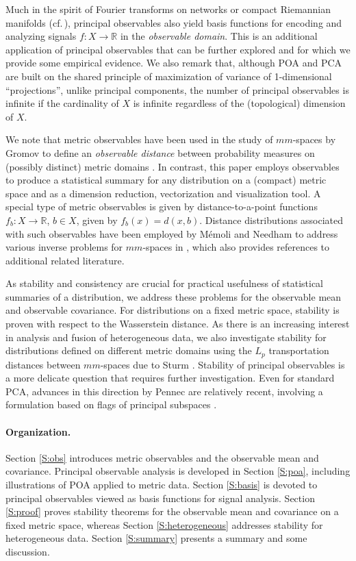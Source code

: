 \documentclass[11pt]{article}
\theoremstyle{definition}
\newcommand{\real}{\ensuremath{\mathbb{R}}}
\begin{document}
Much in the spirit of Fourier transforms on networks or compact Riemannian manifolds (cf.\,\cite{rosenberg_1997,hammond2009}), principal observables also yield basis functions for encoding and analyzing signals $f \colon X \to \real$ in the {\em observable domain}. This is an additional application of principal observables that can be further explored and for which we provide some empirical evidence. We also remark that, although POA and PCA are built on the shared principle of maximization of variance of 1-dimensional ``projections'', unlike principal components, the number of principal observables is infinite if the cardinality of $X$ is infinite regardless of the (topological) dimension of $X$. 

We note that metric observables have been used in the study of $mm$-spaces by Gromov to define an {\em observable distance} between probability measures on (possibly distinct) metric domains \cite{gromov2007mg}. In contrast, this paper employs observables to produce a statistical summary for any distribution on a (compact) metric space and as a dimension reduction, vectorization and visualization tool. A special type of metric observables is given by distance-to-a-point functions $f_b \colon X \to \real$, $b \in X$, given by $f_b (x) = d(x,b)$. Distance distributions associated with such observables have been employed by M\'{e}moli and Needham to address various inverse problems for $mm$-spaces in \cite{distdistr22}, which also provides references to additional related literature. 

As stability and consistency are crucial for practical usefulness of statistical summaries of a distribution, we address these problems for the observable mean and observable covariance. For distributions on a fixed metric space, stability is proven with respect to the Wasserstein distance. As there is an increasing interest in analysis and fusion of heterogeneous data, we also investigate stability for distributions defined on different metric domains using the $L_p$ transportation distances between $mm$-spaces due to Sturm \cite{sturm2006}. Stability of principal observables is a more delicate question that requires further investigation. Even for standard PCA, advances in this direction by Pennec are relatively recent, involving a formulation based on flags of principal subspaces \cite{pennec2018}.

\paragraph{Organization.} Section \ref{S:obs} introduces metric observables and the observable mean and covariance. Principal observable analysis is developed in Section \ref{S:poa}, including illustrations of POA applied to metric data. Section \ref{S:basis} is devoted to principal observables viewed as basis functions for signal analysis. Section \ref{S:proof} proves stability theorems for the observable mean and covariance on a fixed metric space, whereas Section \ref{S:heterogeneous} addresses stability for heterogeneous data. Section \ref{S:summary} presents a summary and some discussion. 
\end{document}
